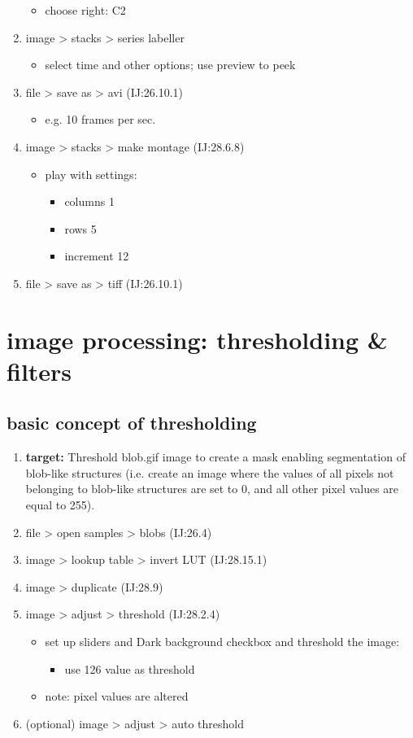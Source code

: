 \documentclass[11pt]{article}
\begin{document}
\begin{enumerate}
\begin{itemize}
\item choose right: C2
\end{itemize}
\item image > stacks > series labeller
\begin{itemize}
\item select time and other options; use preview to peek
\end{itemize}
\item file > save as > avi (IJ:26.10.1)
\begin{itemize}
\item e.g. 10 frames per sec.
\end{itemize}
\item image > stacks > make montage (IJ:28.6.8)
\begin{itemize}
\item play with settings:
\begin{itemize}
\item columns 1
\item rows 5
\item increment 12
\end{itemize}
\end{itemize}
\item file > save as > tiff (IJ:26.10.1)
\end{enumerate}

\section{image processing: thresholding \& filters}
\label{sec-3}
\subsection{basic concept of thresholding}
\label{sec-3-1}
\begin{enumerate}
\item \textbf{target:} Threshold blob.gif image to create a mask enabling
segmentation of blob-like structures (i.e. create an image where the
values of all pixels not belonging to blob-like structures are
set to 0, and all other pixel values are equal to 255).
\item file > open samples > blobs (IJ:26.4)
\item image > lookup table > invert LUT (IJ:28.15.1)
\item image > duplicate (IJ:28.9)
\item image > adjust > threshold (IJ:28.2.4)
\begin{itemize}
\item set up sliders and Dark background checkbox and threshold the
image:
\begin{itemize}
\item use 126 value as threshold
\end{itemize}
\item note: pixel values are altered
\end{itemize}
\item (optional) image > adjust > auto threshold
\end{enumerate}
\end{document}
